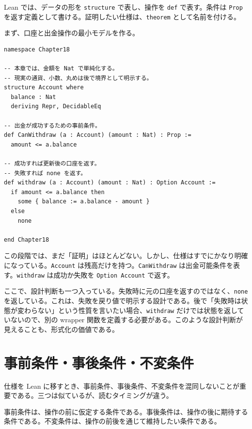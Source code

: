 \begin{leanbox}
Lean では、データの形を \texttt{structure} で表し、操作を \texttt{def} で表す。条件は \texttt{Prop} を返す定義として書ける。証明したい仕様は、\texttt{theorem} として名前を付ける。
\end{leanbox}

まず、口座と出金操作の最小モデルを作る。

\begin{listing}[htbp]
\begin{verbatim}
namespace Chapter18

-- 本章では、金額を Nat で単純化する。
-- 現実の通貨、小数、丸めは後で境界として明示する。
structure Account where
  balance : Nat
  deriving Repr, DecidableEq

-- 出金が成功するための事前条件。
def CanWithdraw (a : Account) (amount : Nat) : Prop :=
  amount <= a.balance

-- 成功すれば更新後の口座を返す。
-- 失敗すれば none を返す。
def withdraw (a : Account) (amount : Nat) : Option Account :=
  if amount <= a.balance then
    some { balance := a.balance - amount }
  else
    none

end Chapter18
\end{verbatim}
\caption{口座出金仕様の最小モデル}
\label{lst:ch18-account-model}
\end{listing}

この段階では、まだ「証明」はほとんどない。しかし、仕様はすでにかなり明確になっている。\texttt{Account} は残高だけを持つ。\texttt{CanWithdraw} は出金可能条件を表す。\texttt{withdraw} は成功か失敗を \texttt{Option Account} で返す。

ここで、設計判断も一つ入っている。失敗時に元の口座を返すのではなく、\texttt{none} を返している。これは、失敗を戻り値で明示する設計である。後で「失敗時は状態が変わらない」という性質を言いたい場合、\texttt{withdraw} だけでは状態を返していないので、別の wrapper 関数を定義する必要がある。このような設計判断が見えることも、形式化の価値である。

\section{事前条件・事後条件・不変条件}

仕様を Lean に移すとき、事前条件、事後条件、不変条件を混同しないことが重要である。三つは似ているが、読むタイミングが違う。

\begin{definitionbox}
事前条件は、操作の前に仮定する条件である。事後条件は、操作の後に期待する条件である。不変条件は、操作の前後を通じて維持したい条件である。
\end{definitionbox}

